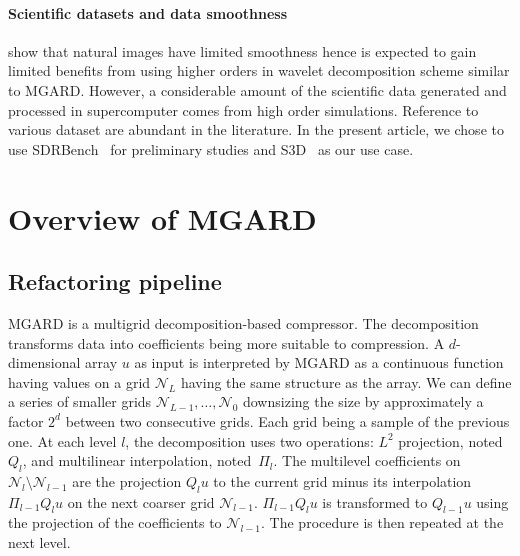 \documentclass[conference]{IEEEtran}
\theoremstyle{remark}
\begin{document}
\paragraph{Scientific datasets and data smoothness}
 \cite{devore1992image,devore1994classifying} show that natural images have limited smoothness hence is expected to gain limited benefits from using higher orders in wavelet decomposition scheme similar to MGARD.
However, a considerable amount of the scientific data generated and processed in supercomputer comes from high order simulations.
Reference to various dataset are abundant in the literature. %
In the present article, we chose to use SDRBench~\cite{zhao2020sdrbench} for preliminary studies and S3D~\cite{yoo2011direct} as our use case.

\section{Overview of MGARD}

\subsection{Refactoring pipeline}
MGARD is a multigrid decomposition-based compressor. The decomposition transforms data into coefficients being more suitable to compression.
A $d$-dimensional array $u$ 
as input is interpreted by MGARD as a continuous function having values on a grid $\mathcal{N}_L$ having the same structure as the array.
We can define a series of smaller grids $\mathcal{N}_{L-1},\hdots,\mathcal{N}_0$ downsizing the size by approximately a factor $2^d$ between two consecutive grids. Each grid being a sample of the previous one.
At each level $l$, the decomposition uses two operations: $L^2$ projection, noted $Q_l$, and multilinear interpolation, noted~$\Pi_l$. %
The multilevel coefficients on $\mathcal{N}_l \setminus \mathcal{N}_{l-1}$ are the projection $Q_lu$ to the current grid minus its interpolation $\Pi_{l-1}Q_lu$ on the next coarser grid $\mathcal{N}_{l-1}$.
$\Pi_{l-1}Q_lu$ is transformed to $Q_{l-1}u$ using the projection of the coefficients to $\mathcal{N}_{l-1}$.
The procedure is then repeated at the next level.
\end{document}
